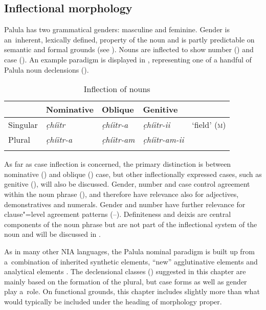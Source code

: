 \subsection{Inflectional morphology}
\label{subsec:4-2-1}

Palula has two grammatical genders: masculine and feminine. Gender is an~inherent, lexically defined, property of the noun and is partly predictable on semantic and formal grounds (see ). Nouns are inflected to show number () and case  (). An example paradigm is displayed in , representing one of a handful of Palula noun declensions (). 


\begin{table}[ht]
\caption{Inflection of nouns}
\begin{tabularx}{\textwidth}{ Q Q Q Q Q }
\lsptoprule
&
Nominative &
Oblique &
Genitive &
\\\midrule
Singular &
\textit{c̣híitr} &
\textit{c̣híitr-a} &
\textit{c̣híitr-ii} &
`field' (\textsc{m})\\
Plural &
\textit{c̣híitr-a} &
\textit{c̣híitr-am} &
\textit{c̣híitr-am-ii} &
\\\lspbottomrule
\end{tabularx}
\label{tab:4-nouns}
\end{table}


As far as case inflection is concerned, the primary distinction is between nominative () and oblique () case, but other inflectionally expressed cases, such as genitive (), will also be discussed. Gender, number and case control agreement within the noun phrase (), and therefore have relevance also for adjectives, demonstratives and numerals. Gender and number have further relevance for clause"=level agreement patterns (--). Definiteness and deixis are central components of the noun phrase but are not part of the inflectional system of the noun and will be discussed in .


As in many other NIA languages, the Palula nominal paradigm is built up from a~combination of inherited synthetic elements, ``new'' agglutinative elements and analytical elements \citep[212]{masica1991}. The declensional classes () suggested in this chapter are mainly based on the formation of the plural, but case forms as well as gender play a~role. On functional grounds, this chapter includes slightly more than what would typically be included under the heading of morphology proper.


